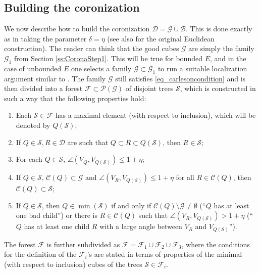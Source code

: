 \documentclass[12pt]{amsart}
\numberwithin{equation}{section}
\theoremstyle{plain}
\theoremstyle{definition}
\theoremstyle{remark}
\begin{document}
\subsection{Building the coronization}\label{ss:BuildingCoronization}
We now describe how to build the coronization $\mathcal{D}=\mathcal{G}\dot{\cup}\mathcal{B}$. This is done exactly as in \cite[p.6--7]{Hahlomaa} taking the parameter $\delta=\eta$ (see also \cite[Section 7]{David1} for the original Euclidean construction). The reader can think that the good cubes $\mathcal{G}$ are simply the family $\mathcal{G}_1$ from Section \ref{ss:CoronaStep1}. This will be true for bounded $E$, and in the case of unbounded $E$ one selects a family $\mathcal{G}\subset \mathcal{G}_1$ to run a suitable localization argument similar to  \cite[p.38]{David1}. The family $\mathcal{G}$ still satisfies \eqref{eq_carlesoncondition} and is then divided into a forest $\mathcal{F}\subset \mathcal P(\mathcal G)$ of disjoint trees $\mathcal S$, %
which is constructed in such a way that the following properties hold:
\begin{enumerate}
\item Each $\mathcal S\in\mathcal F$ has a maximal element (with respect to inclusion), which will be denoted by $Q(\mathcal S)$;
\item If $Q\in\mathcal S, R\in \mathcal D$ are such that $Q\subset R\subset Q(\mathcal S)$, then $R\in\mathcal S$;
\item For each $Q\in\mathcal S$, $\angle(V_Q,V_{Q(\mathcal S)})\leq 1+\eta$;
\item If $Q\in\mathcal S,\, \mathcal C(Q)\subset\mathcal G$ and $\angle(V_R,V_{Q(\mathcal S)})\leq 1+\eta$ for all $R\in \mathcal C(Q)$, then $\mathcal C(Q)\subset \mathcal S$;
\item If $Q\in \mathcal S$, then $Q\in \min(\mathcal S)$ if and only if $\mathcal C(Q)\setminus\mathcal G\neq \emptyset$ (``$Q$ has at least one bad child'') or there is $R\in \mathcal C(Q)$ such that $\angle(V_R, V_{Q(\mathcal S)})>1+\eta$ (``$Q$ has at least one child $R$ with a large angle between $V_R$ and $V_{Q(\mathcal{S})}$'').  
\end{enumerate} The forest $\mathcal F$ is further subdivided as $\mathcal{F}=\mathcal{F}_1\cup \mathcal{F}_2\cup \mathcal{F}_3$, where the conditions for the definition of the $\mathcal{F}_i$'s are stated in terms of properties of the minimal (with respect to inclusion) cubes of the trees $\mathcal{S}\in \mathcal{F}_i$. 
\end{document}
